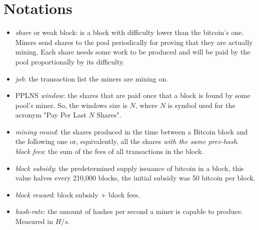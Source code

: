 \documentclass[10pt]{article}
\begin{document}
\section{Notations}
\begin{itemize} 
	\item \emph{share} or weak block: is a block with difficulty lower than the bitcoin's one. Miners send shares to the pool periodically for proving that they are actually mining. Each share needs some work to be produced and will be paid by the pool proportionally by its difficulty.
	\item \emph{job}: the transaction list the miners are mining on.
	\item PPLNS \emph{window}: the shares that are paid once that a block is found by some pool's miner. So, the windows size is $N$, where $N$ is symbol used for the acronym "Pay Per Last $N$ Shares".
	\item \emph{mining round}: the shares produced in the time between a Bitcoin block and the following one or, equivalently, all the shares \emph{with the same prev-hash}.
	\emph \emph{block fees}: the sum of the fees of all transactions in the block. 
	\item \emph{block subsidy}: the predetermined supply issuance of bitcoin in a block, this value halves every 210,000 blocks, the initial subsidy was 50 bitcoin per block.
	\item \emph{block reward}: block subsidy + block fees.
	\item \emph{hash-rate}: the amount of hashes per second a miner is capable to produce. Measured in $H/s$.
\end{itemize}

\end{document}
